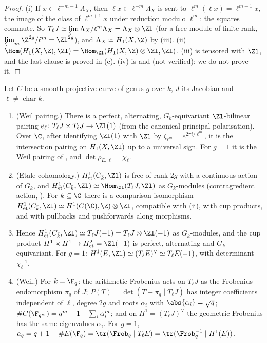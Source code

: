 \begin{proof}
(i) If $x\in\ell^{-m-1}\Lambda_X$, then $\ell x\in\ell^{-m}\Lambda_X$ is sent to $\ell^m(\ell x)=\ell^{m+1}x$, the image of the class of $\ell^{m+1}x$ under reduction modulo $\ell^m$: the squares commute.
So $T_\ell J\simeq\varprojlim\Lambda_X/\ell^m\Lambda_X=\Lambda_X\otimes\Zl$ (for a free module of finite rank, $\varprojlim_m\Z^{2g}/\ell^m=\Zl^{2g}$), and $\Lambda_X\simeq H_1(X,\Z)$ by
(iii). (ii) $\Hom(H_1(X,\Z),\Zl)=\Hom_{\Zl}(H_1(X,\Z)\otimes\Zl,\Zl)$. (iii) is  tensored with $\Zl$, and the last clause is
proved in (c). (iv) is \cite[Section 15]{MilneAbelian86} and \cite[Section 18]{Mumford70} (not verified); we do not prove it.
\end{proof}

\begin{theorem}\label{thm:curves:weil-pairing-etale}
Let $C$ be a smooth projective curve of genus $g$ over $k$, $J$ its Jacobian and $\ell\ne\operatorname{char}k$.
\begin{enumerate}[label=(\alph*)]
\item (Weil pairing.) There is a perfect, alternating, $G_k$-equivariant $\Zl$-bilinear pairing $e_\ell\colon T_\ell J\times T_\ell J\to\Zl(1)$ (from the canonical principal polarisation).
Over $\C$, after identifying $\Zl(1)$ with $\Zl$ by $\zeta_{\ell^m}=e^{2\pi i/\ell^m}$, it is the intersection pairing on $H_1(X,\Zl)$ up to a universal sign. For $g=1$ it is the Weil pairing
of , and $\det\rho_{E,\ell}=\chi_\ell$.
\item (Etale cohomology.) $H^1_{\mathrm{et}}(C_{\bar k},\Zl)$ is free of rank $2g$ with a continuous action of $G_k$, and $H^1_{\mathrm{et}}(C_{\bar k},\Zl)\simeq\Hom_{\Zl}(T_\ell J,\Zl)$ as
$G_k$-modules (contragredient action, ). For $k\subseteq\C$ there is a comparison isomorphism $H^1_{\mathrm{et}}(C_{\bar k},\Zl)\simeq H^1(C(\C),\Z)\otimes\Zl$, compatible with
(ii), with cup products, and with pullbacks and pushforwards along morphisms.
\item Hence $H^1_{\mathrm{et}}(C_{\bar k},\Zl)\simeq T_\ell J(-1)=T_\ell J\otimes\Zl(-1)$ as $G_k$-modules, and the cup product $H^1\times H^1\to H^2_{\mathrm{et}}=\Zl(-1)$ is perfect, alternating and
$G_k$-equivariant. For $g=1$: $H^1(E,\Zl)\simeq(T_\ell E)^\vee\simeq T_\ell E(-1)$, with determinant $\chi_\ell^{-1}$.
\item (Weil.) For $k=\F_q$: the arithmetic Frobenius acts on $T_\ell J$ as the Frobenius endomorphism $\pi_q$ of $J$; $P(T)=\det(T-\pi_q\mid T_\ell J)$ has integer coefficients independent of
$\ell$, degree $2g$ and roots $\alpha_i$ with $\abs{\alpha_i}=\sqrt q$; $\#C(\F_{q^m})=q^m+1-\sum_i\alpha_i^m$; and on $H^1=(T_\ell J)^\vee$ the geometric Frobenius has the same eigenvalues
$\alpha_i$. For $g=1$, $a_q=q+1-\#E(\F_q)=\tr(\Frob_q\mid T_\ell E)=\tr(\Frob_q^{-1}\mid H^1(E))$.
\end{enumerate}
\end{theorem}

